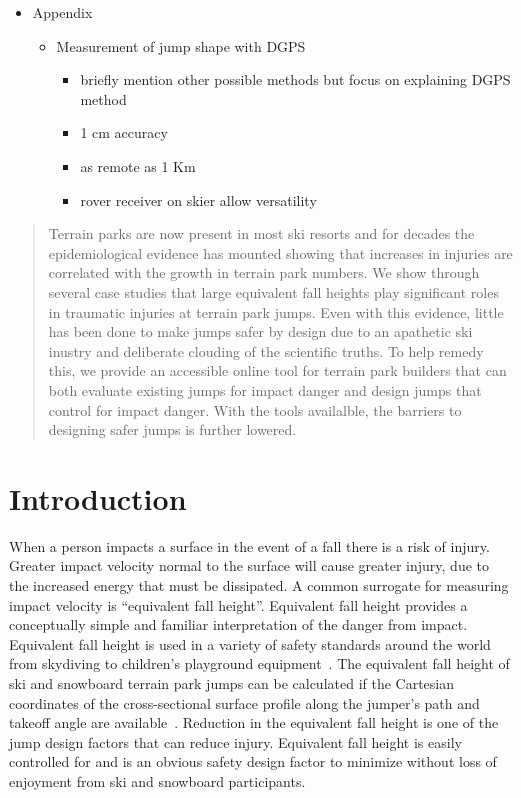 \documentclass{article}
\begin{document}
\begin{itemize}
  \item Appendix
  \begin{itemize}
    \item Measurement of jump shape with DGPS
      \begin{itemize}
        \item briefly mention other possible methods but focus on explaining
          DGPS method
        \item 1 cm accuracy
        \item as remote as 1 Km
        \item rover receiver on skier allow versatility
      \end{itemize}
  \end{itemize}
\end{itemize}

\begin{abstract}
  Terrain parks are now present in most ski resorts and for decades the
  epidemiological evidence has mounted showing that increases in injuries are
  correlated with the growth in terrain park numbers. We show through several
  case studies that large equivalent fall heights play significant roles in
  traumatic injuries at terrain park jumps. Even with this evidence, little has
  been done to make jumps safer by design due to an apathetic ski inustry and
  deliberate clouding of the scientific truths. To help remedy this, we provide
  an accessible online tool for terrain park builders that can both evaluate
  existing jumps for impact danger and design jumps that control for impact
  danger. With the tools availalble, the barriers to designing safer jumps is
  further lowered.
\end{abstract}

\section{Introduction}
%
When a person impacts a surface in the event of a fall there is a risk of
injury. Greater impact velocity normal to the surface will cause greater
injury, due to the increased energy that must be dissipated. A common surrogate
for measuring impact velocity is ``equivalent fall height''.  Equivalent fall
height provides a conceptually simple and familiar interpretation of the danger
from impact. Equivalent fall height is used in a variety of safety standards
around the world from skydiving to children's playground
equipment~\cite{Chalmers1996}. The equivalent fall height of ski and snowboard
terrain park jumps can be calculated if the Cartesian coordinates of the
cross-sectional surface profile along the jumper's path and takeoff angle are
available~\cite{Hubbard2012}. Reduction in the equivalent fall height is one of
the jump design factors that can reduce injury. Equivalent fall height is
easily controlled for and is an obvious safety design factor to minimize
without loss of enjoyment from ski and snowboard participants.
\end{document}
